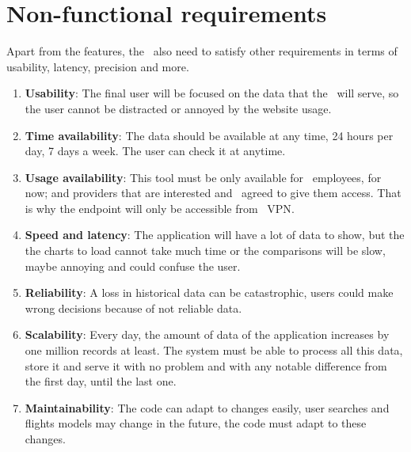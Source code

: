 
\section{Non-functional requirements}

Apart from the features, the \thesis\ also need to satisfy other requirements in terms of usability, latency, precision and more.

\begin{enumerate}
    \item \textbf{Usability}: The final user will be focused on the data that the \thesis\ will serve, so the user cannot be distracted or annoyed by the website usage.
    \\
    \item \textbf{Time availability}: The data should be available at any time, 24 hours per day, 7 days a week. The user can check it at anytime.
    \\
    \item \textbf{Usage availability}: This tool must be only available for \company\ employees, for now; and providers that are interested and \company\ agreed to give them access. That is why the endpoint will only be accessible from \company\ VPN\cite{palo_alto_networks}.
    \\
    \item \textbf{Speed and latency}: The application will have a lot of data to show, but the the charts to load cannot take much time or the comparisons will be slow, maybe annoying and could confuse the user.
    \\
    \item \textbf{Reliability}: A loss in historical data can be catastrophic, users could make wrong decisions because of not reliable data.
    \\
    \item \textbf{Scalability}: Every day, the amount of data of the application increases by one million records at least. The system must be able to process all this data, store it and serve it with no problem and with any notable difference from the first day, until the last one.
    \\
    \item \textbf{Maintainability}: The code can adapt to changes easily, user searches and flights models may change in the future, the code must adapt to these changes.
\end{enumerate}

